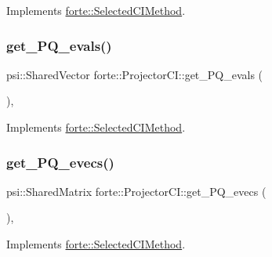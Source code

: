 Implements \mbox{\hyperlink{classforte_1_1_selected_c_i_method_abbe18ea3e5f1a77df13a38764aeef62c}{forte\+::\+Selected\+C\+I\+Method}}.

\mbox{\label{classforte_1_1_projector_c_i_ad6e48a524b58412a569858c9c2b1c232}} 
\subsubsection{\texorpdfstring{get\+\_\+\+P\+Q\+\_\+evals()}{get\_PQ\_evals()}}
{\footnotesize\ttfamily psi\+::\+Shared\+Vector forte\+::\+Projector\+C\+I\+::get\+\_\+\+P\+Q\+\_\+evals (\begin{DoxyParamCaption}{ }\end{DoxyParamCaption})\hspace{0.3cm}{\ttfamily [override]}, {\ttfamily [virtual]}}



Implements \mbox{\hyperlink{classforte_1_1_selected_c_i_method_a675d28ae66341b8cfabb2953c936621c}{forte\+::\+Selected\+C\+I\+Method}}.

\mbox{\label{classforte_1_1_projector_c_i_a3c3dd33031ea7f0764c34db25e8d03a4}} 
\subsubsection{\texorpdfstring{get\+\_\+\+P\+Q\+\_\+evecs()}{get\_PQ\_evecs()}}
{\footnotesize\ttfamily psi\+::\+Shared\+Matrix forte\+::\+Projector\+C\+I\+::get\+\_\+\+P\+Q\+\_\+evecs (\begin{DoxyParamCaption}{ }\end{DoxyParamCaption})\hspace{0.3cm}{\ttfamily [override]}, {\ttfamily [virtual]}}



Implements \mbox{\hyperlink{classforte_1_1_selected_c_i_method_a5e5212836aa0dc35f98238d1f426abed}{forte\+::\+Selected\+C\+I\+Method}}.

